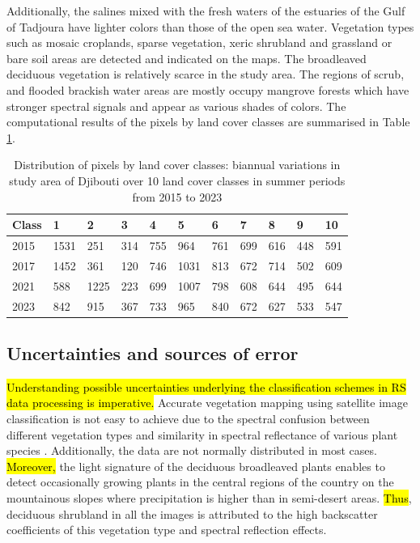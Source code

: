 \documentclass[jimaging,article,submit,pdftex,moreauthors]{Definitions/mdpi}
\begin{document}
Additionally, the salines mixed with the fresh waters of the estuaries of the Gulf of Tadjoura have lighter colors than those of the open sea water. Vegetation types such as mosaic croplands, sparse vegetation, xeric shrubland and grassland or bare soil areas are detected and indicated on the maps. The broadleaved deciduous vegetation is relatively scarce in the study area. The regions of scrub, and flooded brackish water areas are mostly occupy mangrove forests which have stronger spectral signals and appear as various shades of colors. The computational results of the pixels by land cover classes are summarised in Table \ref{tab04}.

\begin{table}[H]
\centering
\begin{tabularx}{\textwidth}{| p{1.5cm} | X | X | X | X | X | X | X | X | X | X | }
  \toprule
   Class & 1 & 2 & 3 & 4 & 5 & 6 & 7 & 8 & 9 & 10 \\
   \midrule
    2015 & 1531 & 251 & 314 & 755 & 964 & 761 & 699 & 616 & 448 & 591 \\
    2017 & 1452 & 361 & 120 & 746 & 1031 & 813 & 672 & 714 & 502 & 609 \\
    2021 & 588 & 1225 & 223 & 699 & 1007 & 798 & 608 & 644 & 495 & 644 \\
    2023 & 842 & 915 & 367 & 733 & 965 & 840 & 672 & 627 & 533 & 547 \\
    \bottomrule
\end{tabularx}
\caption{Distribution of pixels by land cover classes: biannual variations in study area of Djibouti over 10 land cover classes in summer periods from 2015 to 2023}\label{tab04}
\end{table}

\subsection{Uncertainties and sources of error}

\hl{Understanding possible uncertainties underlying the classification schemes in RS data processing is imperative. }Accurate vegetation mapping using satellite image classification is not easy to achieve due to the spectral confusion between different vegetation types and\hl{ }similarity in spectral reflectance of various plant species \cite{1370179,Dobrowski,Moore,8688643}. Additionally, the data are not normally distributed in most cases. \hl{Moreover, }the light signature of the deciduous broadleaved plants enables to detect occasionally growing plants in the central regions of the country on the mountainous slopes where precipitation is higher than in semi-desert areas. \hl{Thus}, deciduous shrubland in all the images is attributed to the high backscatter coefficients of this vegetation type and spectral reflection effects.
\end{document}
